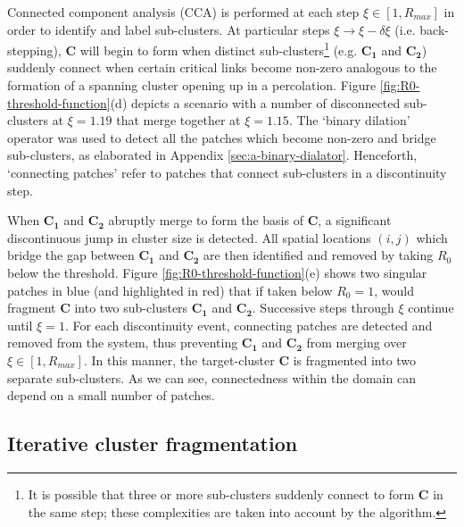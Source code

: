 Connected component analysis (CCA) is performed at each step $\xi \in [1, R_{max}]$ in order to identify and label sub-clusters. 
At particular steps $\xi \rightarrow \xi - \delta\xi$ (i.e. back-stepping), $\mathbf{C}$ will begin to form when distinct sub-clusters\footnote{
It is possible that three or more sub-clusters suddenly connect to form $\mathbf{C}$ in the same step; 
these complexities are taken into account by the algorithm.} 
 (e.g. $\mathbf{C_1}$ and $\mathbf{C_2}$) suddenly connect when certain critical links become non-zero\textemdash
analogous to the formation of a spanning cluster opening up in a percolation. 
Figure \ref{fig:R0-threshold-function}(d) depicts a scenario with a number of disconnected sub-clusters at $\xi=1.19$ that merge together at $\xi=1.15$.
The `binary dilation' operator \cite{liang1989erosion, 23111, nachtegael2001connections} was used to detect all the patches which become non-zero and bridge sub-clusters, as elaborated in Appendix \ref{sec:a-binary-dialator}.
Henceforth, `connecting patches' refer to patches that connect sub-clusters in a discontinuity step.

When $\mathbf{C_1}$ and $\mathbf{C_2}$ abruptly merge to form the basis of $\mathbf{C}$, a significant discontinuous jump in cluster size is detected. 
All spatial locations $(i,j)$ which bridge the gap between $\mathbf{C_1}$ and $\mathbf{C_2}$ are then identified and removed by taking $R_0$ below the threshold.
Figure \ref{fig:R0-threshold-function}(e) shows two singular patches in blue (and highlighted in red) that if taken below $R_0=1$,
would fragment $\mathbf{C}$ into two sub-clusters $\mathbf{C_1}$ and $\mathbf{C_2}$.
Successive steps through $\xi$ continue until $\xi=1$.
For each discontinuity event, connecting patches are detected and removed from the system,
thus preventing $\mathbf{C_1}$ and $\mathbf{C_2}$ from merging over $\xi \in [1, R_{max}]$.
In this manner, the target-cluster $\mathbf{C}$ is fragmented into two separate sub-clusters. 
As we can see, connectedness within the domain can depend on a small number of patches.

\subsection{Iterative cluster fragmentation}
\label{sec:fragmentation-method-2}

